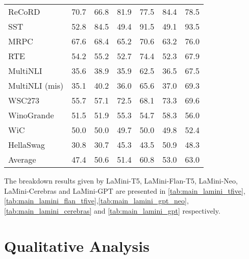 \documentclass[11pt]{article}
\newcommand{\modelname}{LaMini\xspace}
\begin{document}
\begin{table*}[t]
\begin{tabular}{@{}lcccccc@{}}
ReCoRD         & 70.7   & 66.8            & 81.9   & 77.5            & 84.4   & 78.5            \\
SST            & 52.8   & 84.5            & 49.4   & 91.5            & 49.1   & 93.5            \\
MRPC           & 67.6   & 68.4            & 65.2   & 70.6            & 63.2   & 76.0            \\
RTE            & 54.2   & 55.2            & 52.7   & 74.4            & 52.3   & 67.9            \\
MultiNLI       & 35.6   & 38.9            & 35.9   & 62.5            & 36.5   & 67.5            \\
MultiNLI (mis) & 35.1   & 40.2            & 36.0   & 65.6            & 37.0   & 69.3            \\
WSC273         & 55.7   & 57.1            & 72.5   & 68.1            & 73.3   & 69.6            \\
WinoGrande     & 51.5   & 51.9            & 55.3   & 54.7            & 58.3   & 56.0            \\
WiC            & 50.0   & 50.0            & 49.7   & 50.0            & 49.8   & 52.4            \\
HellaSwag      & 30.8   & 30.7            & 45.3   & 43.5            & 50.9   & 48.3            \\ \midrule
Average        & 47.4   & 50.6            & 51.4   & 60.8            & 53.0   & 63.0            \\ \bottomrule
\end{tabular}
\caption{
Automatic evaluation results of \modelname-GPT language models and their baselines on 15 NLP tasks.
``Average'' indicates the micro-average of the individual task results.
}
\label{tab:main_lamini_gpt}
\end{table*} 

The breakdown results given by \modelname-T5, \modelname-Flan-T5, \modelname-Neo, \modelname-Cerebras and \modelname-GPT are presented in \autoref{tab:main_lamini_tfive},\autoref{tab:main_lamini_flan_tfive},\autoref{tab:main_lamini_gpt_neo},\autoref{tab:main_lamini_cerebras} and \autoref{tab:main_lamini_gpt} respectively.



\section{Qualitative Analysis}
 
\end{document}
